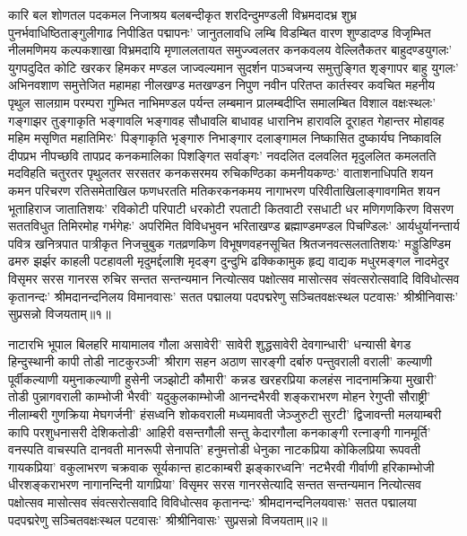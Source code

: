 \begin{flushleft}
कारि बल शोणतल पदकमल निजाश्रय बलबन्दीकृत शरदिन्दुमण्डली विभ्रमदादभ्र शुभ्र पुनर्भवाधिष्ठिताङ्गुलीगाढ निपीडित पद्मापनः' जानुतलावधि लम्बि विडम्बित वारण शुण्डादण्ड विजृम्भित नीलमणिमय कल्पकशाखा विभ्रमदायि मृणाललतायत समुज्ज्वलतर कनकवलय वेल्लितैकतर बाहुदण्डयुगलः' युगपदुदित कोटि खरकर हिमकर मण्डल जाज्वल्यमान सुदर्शन पाञ्चजन्य समुत्तुङ्गित शृङ्गापर बाहु युगलः' अभिनवशाण समुत्तेजित महामहा नीलखण्ड मतखण्डन निपुण नवीन परितप्त कार्तस्वर कवचित महनीय पृथुल सालग्राम परम्परा गुम्भित नाभिमण्डल पर्यन्त लम्बमान प्रालम्बदीप्ति समालम्बित विशाल वक्षःस्थलः' गङ्गाझर तुङ्गाकृति भङ्गावलि भङ्गावह सौधावलि बाधावह धारानिभ हारावलि दूराहत गेहान्तर मोहावह महिम मसृणित महातिमिरः' पिङ्गाकृति भृङ्गारु निभाङ्गार दलाङ्गामल निष्कासित दुष्कार्यघ निष्कावलि दीपप्रभ नीपच्छवि तापप्रद कनकमालिका पिशङ्गित सर्वाङ्गः' नवदलित दलवलित मृदुललित कमलतति मदविहति चतुरतर पृथुलतर सरसतर कनकसरमय रुचिकण्ठिका कमनीयकण्ठः' वाताशनाधिपति शयन कमन परिचरण रतिसमेताखिल फणधरतति मतिकरकनकमय नागाभरण परिवीताखिलाङ्गावगमित शयन भूताहिराज जातातिशयः' रविकोटी परिपाटी धरकोटी रपताटी कितवाटी रसधाटी धर मणिगणकिरण विसरण सततविधुत तिमिरमोह गर्भगेहः' अपरिमित विविधभुवन भरिताखण्ड ब्रह्माण्डमण्डल पिचण्डिलः' आर्यधुर्यानन्तार्य पवित्र खनित्रपात पात्रीकृत निजचुबुक गतव्रणकिण विभूषणवहनसूचित श्रितजनवत्सलतातिशयः' मड्डुडिण्डिम ढमरु झर्झर काहली पटहावली मृदुमर्द्दलाशि मृदङ्ग दुन्दुभि ढक्किकामुक हृद्य वाद्यक मधुरमङ्गल नादमेदुर विसृमर सरस गानरस रुचिर सन्तत सन्तन्यमान नित्योत्सव पक्षोत्सव मासोत्सव संवत्सरोत्सवादि विविधोत्सव कृतानन्दः' श्रीमदानन्दनिलय विमानवासः' सतत पद्मालया पदपद्मरेणु सञ्चितवक्षःस्थल पटवासः' श्रीश्रीनिवासः' सुप्रसन्नो विजयताम्॥१॥

नाटारभि भूपाल बिलहरि मायामालव गौला असावेरी' सावेरी
शुद्धसावेरी देवगान्धारी' धन्यासी बेगड हिन्दुस्थानी कापी तोडी नाटकुरञ्जी' श्रीराग सहन अठाण सारङ्गी दर्बारु पन्तुवराली वराली' कल्याणी पूर्वीकल्याणी यमुनाकल्याणी हुसेनी जञ्झोटी कौमारी'
कन्नड खरहरप्रिया कलहंस नादनामक्रिया मुखारी' तोडी पुन्नागवराली
काम्भोजी भैरवी' यदुकुलकाम्भोजी आनन्दभैरवी शङ्कराभरण मोहन
रेगुप्ती सौराष्ट्री' नीलाम्बरी गुणक्रिया मेघगर्जनी' हंसध्वनि शोकवराली मध्यमावती जेञ्जुरुटी सुरटी' द्विजावन्ती मलयाम्बरी कापि
परशुधनासरी देशिकतोडी' आहिरी वसन्तगौली सन्तु केदारगौला कनकाङ्गी रत्नाङ्गी गानमूर्ति' वनस्पति वाचस्पति दानवती मानरूपी सेनापति' हनुमत्तोडी धेनुका नाटकप्रिया कोकिलप्रिया रूपवती गायकप्रिया' वकुलाभरण चक्रवाक सूर्यकान्त हाटकाम्बरी
झङ्कारध्वनि' नटभैरवी गीर्वाणी हरिकाम्भोजी धीरशङ्कराभरण नागानन्दिनी यागप्रिया' विसृमर सरस गानरसेत्यादि सन्तत
सन्तन्यमान नित्योत्सव पक्षोत्सव मासोत्सव संवत्सरोत्सवादि
विविधोत्सव कृतानन्दः' श्रीमदानन्दनिलयवासः' सतत पद्मालया पदपद्मरेणु सञ्चितवक्षःस्थल पटवासः' श्रीश्रीनिवासः' सुप्रसन्नो विजयताम्॥२॥


\end{flushleft}
